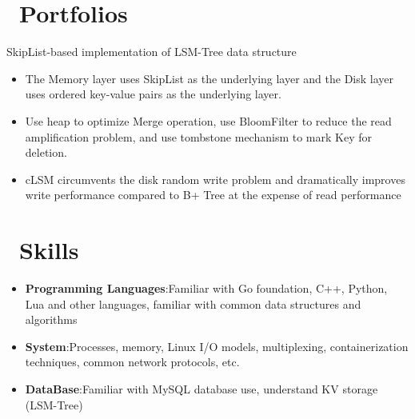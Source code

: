 \documentclass{resume}
\newcommand{\en}[1]{#1}
\newcommand{\zh}[1]{}
\begin{document}
\section{\faGithubAlt\ \en{Portfolios}\zh{个人项目}}
\en{SkipList-based implementation of LSM-Tree data structure}
\zh{基于 SkipList 的 LSM-Tree 数据结构实现}
\begin{itemize}[parsep=0.5ex]
      \item \en{The Memory layer uses SkipList as the underlying layer and the Disk layer uses ordered key-value pairs as the underlying layer.}
            \zh{Memory 层采用 SkipList 作为底层,Disk 层使用有序键值对作为底层}
      \item \en{Use heap to optimize Merge operation, use BloomFilter to reduce the read amplification problem, and use tombstone mechanism to mark Key for deletion.}
            \zh{利用堆优化 Merge 操作,利用 BloomFilter 降低读放大问题,删除采用墓碑机制标记 Key}
      \item \en{cLSM circumvents the disk random write problem and dramatically improves write performance compared to B+ Tree at the expense of read performance}
            \zh{cLSM 规避磁盘随机写入问题,相比 B+ Tree 牺牲读性能,大幅提高写性能}
\end{itemize}

\section{\faCogs\ \en{Skills}\zh{技能}}
\begin{itemize}[parsep=0.5ex]
      \item \en{\textbf{Programming Languages}:Familiar with Go foundation, C++, Python, Lua and other languages, familiar with common data structures and algorithms}
            \zh{\textbf{编程语言}: 熟悉 Go 基础,了解 C++、Python、Lua 等语言,熟悉常用数据结构与算法}
      \item \en{\textbf{System}:Processes, memory, Linux I/O models, multiplexing, containerization techniques, common network protocols, etc.}
            \zh{\textbf{系统}: 进程、内存、Linux I/O 模型、多路复用、容器化技术、常见网络协议等}
      \item \en{\textbf{DataBase}:Familiar with MySQL database use, understand KV storage (LSM-Tree)}
            \zh{\textbf{数据库}: 熟悉 MySQL 数据库使用,了解 KV 存储(LSM-Tree)}
\end{itemize}
\end{document}

